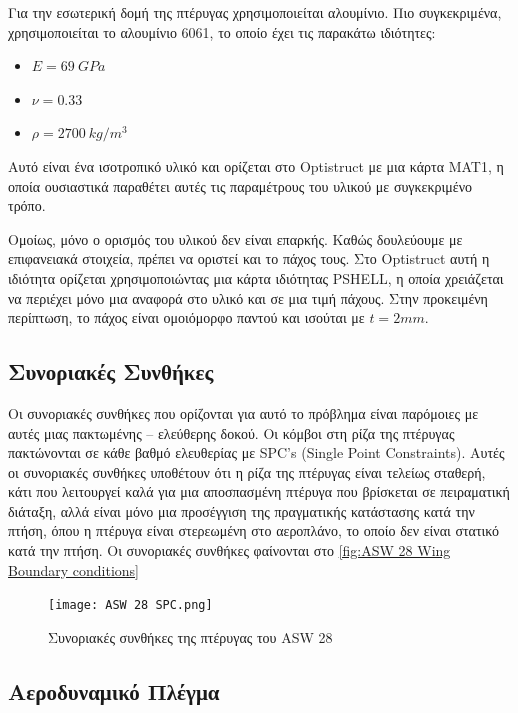   Για την εσωτερική δομή της πτέρυγας χρησιμοποιείται αλουμίνιο. Πιο συγκεκριμένα, χρησιμοποιείται το αλουμίνιο 6061, το οποίο έχει τις παρακάτω ιδιότητες:
  

\begin{itemize}
\item
  \(E = 69\ GPa\)
\item
  \(\nu = 0.33\)
\item
  \(\rho = 2700\ kg\text{/}m^{3}\)
\end{itemize}

Αυτό είναι ένα ισοτροπικό υλικό και ορίζεται στο \textlatin{Optistruct} με μια κάρτα MAT1, η οποία ουσιαστικά παραθέτει αυτές τις παραμέτρους του υλικού με συγκεκριμένο τρόπο.

Ομοίως, μόνο ο ορισμός του υλικού δεν είναι επαρκής. Καθώς δουλεύουμε με επιφανειακά στοιχεία, πρέπει να οριστεί και το πάχος τους. Στο \textlatin{Optistruct} αυτή η ιδιότητα ορίζεται χρησιμοποιώντας μια κάρτα ιδιότητας \textlatin{PSHELL}, η οποία χρειάζεται  να περιέχει μόνο μια αναφορά στο υλικό και σε μια τιμή πάχους. Στην προκειμένη περίπτωση, το πάχος είναι ομοιόμορφο παντού και ισούται με \(t = 2mm\).


\subsection{Συνοριακές Συνθήκες} \label{boundary-conditions}

Οι συνοριακές συνθήκες που ορίζονται για αυτό το πρόβλημα είναι παρόμοιες με αυτές μιας πακτωμένης -- ελεύθερης δοκού. Οι κόμβοι στη ρίζα της πτέρυγας πακτώνονται σε κάθε βαθμό ελευθερίας με  \textlatin{SPC's (Single Point Constraints)}. Αυτές οι συνοριακές συνθήκες υποθέτουν ότι η ρίζα της πτέρυγας είναι τελείως σταθερή, κάτι που λειτουργεί καλά για μια αποσπασμένη πτέρυγα που βρίσκεται σε πειραματική διάταξη, αλλά είναι μόνο μια προσέγγιση της πραγματικής κατάστασης κατά την πτήση, όπου η πτέρυγα είναι στερεωμένη στο αεροπλάνο, το οποίο δεν είναι στατικό κατά την πτήση. Οι συνοριακές συνθήκες φαίνονται στο \autoref{fig:ASW 28 Wing Boundary conditions}


\begin{figure}[H]
\centering
\texttt{[image: ASW 28 SPC.png]}
\caption{Συνοριακές συνθήκες της πτέρυγας του \textlatin{ASW 28} }
\label{fig:ASW 28 Wing Boundary conditions}

\end{figure}

\subsection{Αεροδυναμικό Πλέγμα}
\label{aerodynamic-grid}

